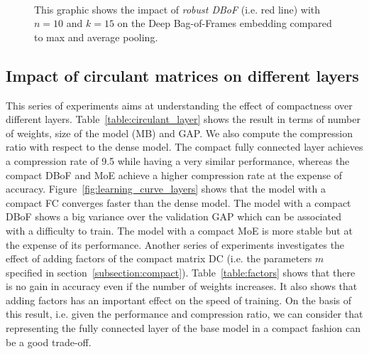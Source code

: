 \documentclass[runningheads]{llncs}
\begin{document}
\begin{figure}[!htb]
  \centering
  \\[-0.3cm]
  \setlength{\belowcaptionskip}{-0.4cm}
  \caption{This graphic shows the impact of \textit{robust DBoF} (i.e. red line) with $n=10$ and $k=15$ on the Deep Bag-of-Frames embedding compared to max and average pooling.}
  \label{fig:learning_curve_bagging}
\end{figure}

\subsection{Impact of circulant matrices on different layers}
This series of experiments aims at understanding the effect of compactness over different layers. Table~\ref{table:circulant_layer} shows the result in terms of number of weights, size of the model (MB) and GAP. We also compute the compression ratio with respect to the dense model. The compact fully connected layer achieves a compression rate of 9.5 while having a very similar performance, whereas the compact DBoF and MoE achieve a higher compression rate at the expense of accuracy. 
Figure~\ref{fig:learning_curve_layers} shows that the model with a compact FC converges faster than the dense model. The model with a compact DBoF shows a big variance over the validation GAP which can be associated with a difficulty to train. The model with a compact MoE is more stable but at the expense of its performance.
Another series of experiments investigates the effect of adding factors of the compact matrix DC (i.e. the parameters $m$ specified in section~\ref{subsection:compact}). Table~\ref{table:factors} shows that there is no gain in accuracy even if the number of weights increases. It also shows that adding factors has an important effect on the  speed of training. On the basis of this result, i.e. given the performance and compression ratio, we can consider that representing the fully connected layer of the base model in a compact fashion can be a good trade-off.
\end{document}
